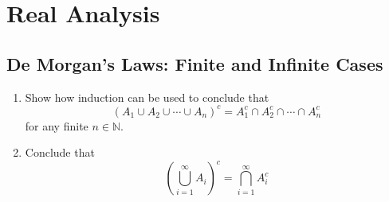 \documentclass[./my-proofs.tex]{subfiles}
\begin{document}
\section{Real Analysis}

\subsection{De Morgan's Laws: Finite and Infinite Cases}
\begin{enumerate}
    \item Show how induction can be used to conclude that
          \begin{equation}
              {\left(A_1\cup A_2 \cup \cdots \cup A_n\right)}^{c} =A_1^{c} \cap A_2^{c} \cap \cdots \cap A_n^{c}
          \end{equation}
          for any finite $n\in\mathbb{N}$.

    \item Conclude that
          \begin{equation}
              {\left(\bigcup^{\infty}_{i=1}{A_i}\right)}^{c} = \bigcap^{\infty}_{i=1}{A_i^{c}}
          \end{equation}
\end{enumerate}
\end{document}
